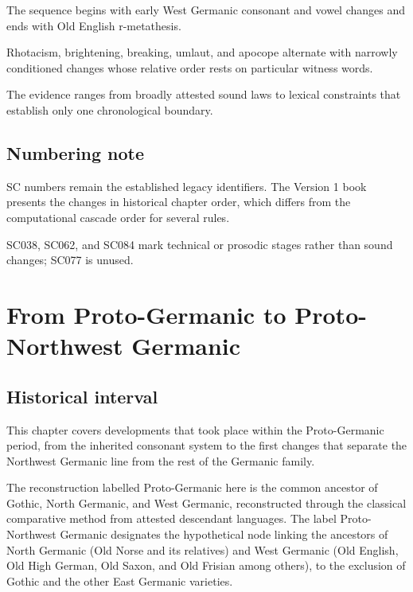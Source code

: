 \documentclass[
  british,
  a4paper,
  openany]{book}
\begin{document}
The sequence begins with early West Germanic consonant and vowel changes
and ends with Old English r-metathesis.

Rhotacism, brightening, breaking, umlaut, and apocope alternate with
narrowly conditioned changes whose relative order rests on particular
witness words.

The evidence ranges from broadly attested sound laws to lexical
constraints that establish only one chronological boundary.

\section*{Numbering note}\label{numbering-note}

SC numbers remain the established legacy identifiers. The Version 1 book
presents the changes in historical chapter order, which differs from the
computational cascade order for several rules.

SC038, SC062, and SC084 mark technical or prosodic stages rather than
sound changes; SC077 is unused.

\newpage

\chapter{From Proto-Germanic to Proto-Northwest
Germanic}\label{from-proto-germanic-to-proto-northwest-germanic}

\section{Historical interval}\label{historical-interval}

This chapter covers developments that took place within the
Proto-Germanic period, from the inherited consonant system to the first
changes that separate the Northwest Germanic line from the rest of the
Germanic family.

The reconstruction labelled Proto-Germanic here is the common ancestor
of Gothic, North Germanic, and West Germanic, reconstructed through the
classical comparative method from attested descendant languages. The
label Proto-Northwest Germanic designates the hypothetical node linking
the ancestors of North Germanic (Old Norse and its relatives) and West
Germanic (Old English, Old High German, Old Saxon, and Old Frisian among
others), to the exclusion of Gothic and the other East Germanic
varieties.
\end{document}
